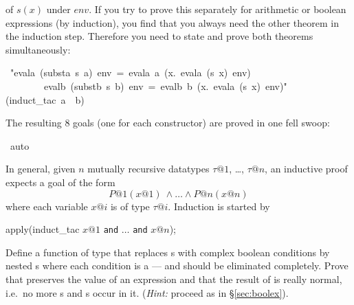 \begin{isabelle}
\begin{isamarkuptext}
of $s(x)$ under $env$. If you try to prove this separately for arithmetic or
boolean expressions (by induction), you find that you always need the other
theorem in the induction step. Therefore you need to state and prove both
theorems simultaneously:%
\end{isamarkuptext}%
\ {"}evala\ (substa\ s\ a)\ env\ =\ evala\ a\ ({\isasymlambda}x.\ evala\ (s\ x)\ env)\ {\isasymand}\isanewline
\ \ \ \ \ \ \ \ evalb\ (substb\ s\ b)\ env\ =\ evalb\ b\ ({\isasymlambda}x.\ evala\ (s\ x)\ env){"}\isanewline
{}(induct\_tac\ a\ \ b)%
\begin{isamarkuptxt}%
\noindent
The resulting 8 goals (one for each constructor) are proved in one fell swoop:%
\end{isamarkuptxt}%
\ auto%
\begin{isamarkuptext}%
In general, given $n$ mutually recursive datatypes $\tau@1$, \dots, $\tau@n$,
an inductive proof expects a goal of the form
\[ P@1(x@1)\ \land \dots \land P@n(x@n) \]
where each variable $x@i$ is of type $\tau@i$. Induction is started by
\begin{ttbox}
apply(induct_tac \(x@1\) \texttt{and} \(\dots\) \texttt{and} \(x@n\));
\end{ttbox}

\begin{exercise}
  Define a function  of type  that
  replaces s with complex boolean conditions by nested
  s where each condition is a  ---  and
   should be eliminated completely. Prove that 
  preserves the value of an expression and that the result of 
  is really normal, i.e.\ no more s and s occur in
  it.  ({\em Hint:} proceed as in \S\ref{sec:boolex}).
\end{exercise}%
\end{isamarkuptext}%
\end{isabelle}%
